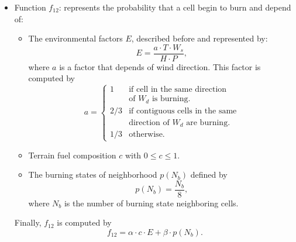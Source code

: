 \documentclass[conference]{IEEEtran}
\begin{document}
            \begin{itemize}
                \item Function $f_{12}$: represents the probability that a cell begin to burn and depend of:
                    \begin{itemize}
                        \item The environmental factors $E$, described before and represented by:
                            \begin{equation}
                                E = \frac{a \cdot T \cdot W_s}{H \cdot P},
                            \end{equation}
                            where $a$ is a factor that depends of wind direction. This factor is computed by
                            \begin{equation}
                                a = 
                                \begin{cases}
                                    1 & \text{if cell in the same direction} \\
                                     & \text{of $W_d$ is burning.}\\
                                    2/3 & \text{if contiguous cells in the same} \\
                                     & \text{direction of $W_d$ are burning.} \\
                                    1/3 & \text{otherwise.}
                                \end{cases}
                            \end{equation}
                            
                        \item Terrain fuel composition $c$ with $0\leq c\leq 1$.
                        \item The burning states of neighborhood $p(N_b)$ defined by
                            \begin{equation}
                                p(N_b) = \frac{N_b}{8},
                            \end{equation}
                            where $N_b$ is the number of burning state neighboring cells.
                        \end{itemize}
                        Finally, $f_{12}$ is computed by
                            \begin{equation}
                                f_{12} = \alpha \cdot c\cdot E + \beta \cdot p(N_b).
                            \end{equation}
                            

\end{itemize}
\end{document}
